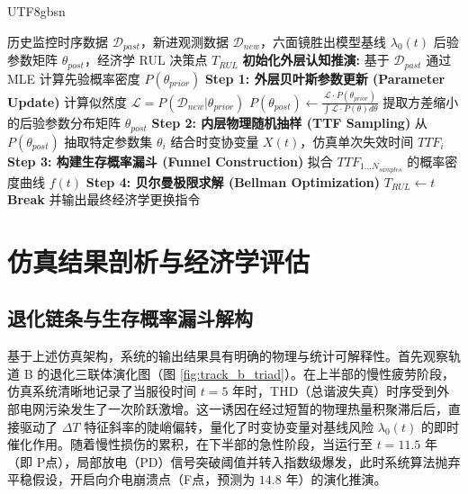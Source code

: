 \documentclass[journal]{IEEEtran}
\begin{document}
\begin{CJK*}{UTF8}{gbsn}
\begin{algorithm}[H]
\caption{基于贝叶斯嵌套蒙特卡洛的变压器经济寿命审计}
\label{algo:nested_bayesian}
\begin{algorithmic}[1]
\REQUIRE 历史监控时序数据 $\mathcal{D}_{past}$，新进观测数据 $\mathcal{D}_{new}$，六面镜胜出模型基线 $\lambda_0(t)$
\ENSURE 后验参数矩阵 $\theta_{post}$，经济学 RUL 决策点 $T_{RUL}$
\STATE \textbf{初始化外层认知推演:}
\STATE 基于 $\mathcal{D}_{past}$ 通过 MLE 计算先验概率密度 $P(\theta_{prior})$
    \STATE \textbf{Step 1: 外层贝叶斯参数更新 (Parameter Update)}
    \STATE 计算似然度 $\mathcal{L} = P(\mathcal{D}_{new} | \theta_{prior})$
    \STATE $P(\theta_{post}) \leftarrow \frac{\mathcal{L} \cdot P(\theta_{prior})}{\int \mathcal{L} \cdot P(\theta) d\theta}$
    \STATE 提取方差缩小的后验参数分布矩阵 $\theta_{post}$
    \STATE \textbf{Step 2: 内层物理随机抽样 (TTF Sampling)}
        \STATE 从 $P(\theta_{post})$ 抽取特定参数集 $\theta_i$
        \STATE 结合时变协变量 $X(t)$，仿真单次失效时间 $TTF_i$
    \ENDFOR
    \STATE \textbf{Step 3: 构建生存概率漏斗 (Funnel Construction)}
    \STATE 拟合 $TTF_{1...N_{samples}}$ 的概率密度曲线 $f(t)$
    \STATE \textbf{Step 4: 贝尔曼极限求解 (Bellman Optimization)}
        \STATE $T_{RUL} \leftarrow t$ 
        \STATE \textbf{Break} 并输出最终经济学更换指令
    \ENDIF
\ENDWHILE
\end{algorithmic}
\end{algorithm}

\section{仿真结果剖析与经济学评估}
\subsection{退化链条与生存概率漏斗解构}
基于上述仿真架构，系统的输出结果具有明确的物理与统计可解释性。首先观察轨道 B 的退化三联体演化图（图 \ref{fig:track_b_triad}）。在上半部的慢性疲劳阶段，仿真系统清晰地记录了当服役时间 $t=5$ 年时，THD（总谐波失真）时序受到外部电网污染发生了一次阶跃激增。这一诱因在经过短暂的物理热量积聚滞后后，直接驱动了 $\Delta T$ 特征斜率的陡峭偏转，量化了时变协变量对基线风险 $\lambda_0(t)$ 的即时催化作用。随着慢性损伤的累积，在下半部的急性阶段，当运行至 $t=11.5$ 年（即 P点），局部放电（PD）信号突破阈值并转入指数级爆发，此时系统算法抛弃平稳假设，开启向介电崩溃点（F点，预测为 $14.8$ 年）的演化推演。


\end{CJK*}
\end{document}
